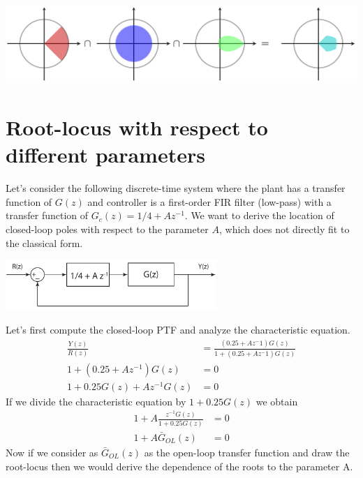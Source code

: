 \documentclass[twoside]{article}
\begin{document}
\begin{center}
\begin{minipage}[h]{\linewidth}
    \begin{center}
      \includegraphics[width=\textwidth]{region}
    \end{center}
\end{minipage}
\end{center}

\newpage

\section*{Root-locus with respect to different parameters}

Let's consider the following discrete-time system where the plant has a 
transfer function of $G(z)$ and controller is a first-order FIR filter
(low-pass) with a transfer function of  $G_c(z) = 1/4 + A z^{-1}$.
We want to derive the location of closed-loop poles with respect to 
the parameter $A$, which does not directly fit to the classical form. 

\begin{center}
\begin{minipage}[h]{\linewidth}
    \begin{center}
      \includegraphics[width=0.6\textwidth]{distdiff}
    \end{center}
\end{minipage}
\end{center}

Let's first compute the closed-loop PTF and analyze the characteristic
equation.
%
\begin{align*}
  \frac{Y(z)}{R(z)} &= \frac{ \left(0.25 + A z^-1 \right) G(z) }{1 +
                      \left (0.25 + A z^-1 \right) G(z)} 
\\
1 + \left( 0.25 + A z^{-1} \right) G(z) &= 0
\\
1 + 0.25 G(z) + A z^{-1} G(z) &= 0
\end{align*}
%
If we divide the characteristic equation by $1 + 0.25 G(z)$ we obtain
%
\begin{align*}
1+ A \frac{z^{-1} G(z)}{1 + 0.25 G(z)} &= 0
\\
1+ A \bar{G}_{OL}(z) &= 0
\end{align*}
%
Now if we consider as $\bar{G}_{OL}(z)$ as the open-loop transfer
function and draw the root-locus then we would derive the dependence 
of the roots to the parameter A. 
\end{document}
